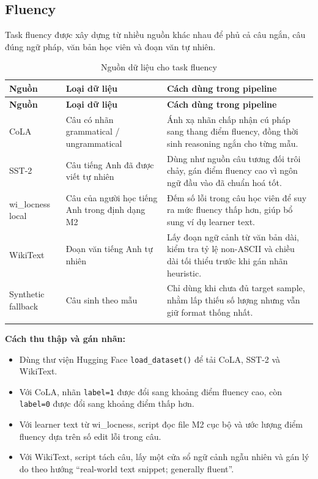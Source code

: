 \documentclass[12pt,a4paper]{article}
\begin{document}
\subsection{Fluency}

Task fluency được xây dựng từ nhiều nguồn khác nhau để phủ cả câu ngắn, câu đúng ngữ pháp, văn bản học viên và đoạn văn tự nhiên.

\begin{longtable}{p{3.2cm}p{4.3cm}p{7cm}}
\toprule
\textbf{Nguồn} & \textbf{Loại dữ liệu} & \textbf{Cách dùng trong pipeline} \\
\midrule
\endfirsthead
\toprule
\textbf{Nguồn} & \textbf{Loại dữ liệu} & \textbf{Cách dùng trong pipeline} \\
\midrule
\endhead
CoLA & Câu có nhãn grammatical / ungrammatical & Ánh xạ nhãn chấp nhận cú pháp sang thang điểm fluency, đồng thời sinh reasoning ngắn cho từng mẫu. \\
SST-2 & Câu tiếng Anh đã được viết tự nhiên & Dùng như nguồn câu tương đối trôi chảy, gán điểm fluency cao vì ngôn ngữ đầu vào đã chuẩn hoá tốt. \\
wi\_locness local & Câu của người học tiếng Anh trong định dạng M2 & Đếm số lỗi trong câu học viên để suy ra mức fluency thấp hơn, giúp bổ sung ví dụ learner text. \\
WikiText & Đoạn văn tiếng Anh tự nhiên & Lấy đoạn ngữ cảnh từ văn bản dài, kiểm tra tỷ lệ non-ASCII và chiều dài tối thiểu trước khi gán nhãn heuristic. \\
Synthetic fallback & Câu sinh theo mẫu & Chỉ dùng khi chưa đủ target sample, nhằm lấp thiếu số lượng nhưng vẫn giữ format thống nhất. \\
\bottomrule
\caption{Nguồn dữ liệu cho task fluency}
\end{longtable}

\textbf{Cách thu thập và gán nhãn:}
\begin{itemize}[leftmargin=1.2cm]
    \item Dùng thư viện Hugging Face \texttt{load\_dataset()} để tải CoLA, SST-2 và WikiText.
    \item Với CoLA, nhãn \texttt{label=1} được đổi sang khoảng điểm fluency cao, còn \texttt{label=0} được đổi sang khoảng điểm thấp hơn.
    \item Với learner text từ wi\_locness, script đọc file M2 cục bộ và ước lượng điểm fluency dựa trên số edit lỗi trong câu.
    \item Với WikiText, script tách câu, lấy một cửa sổ ngữ cảnh ngẫu nhiên và gán lý do theo hướng ``real-world text snippet; generally fluent''.
\end{itemize}
\end{document}
